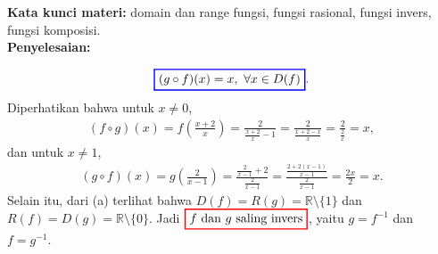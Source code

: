 \documentclass[10pt,openany,a4paper]{article}
\theoremstyle{definition}
\theoremstyle{definition}
\theoremstyle{plain}
\newenvironment{jawab}[2][tes]{%
\par\noindent\textbf{Kata kunci materi:} #1.\\
\textbf{Penyelesaian:} #2%
}{}
\begin{document}
\begin{enumerate}
\begin{jawab}[domain dan range fungsi, fungsi rasional, fungsi invers, fungsi komposisi]
{\begin{enumerate}
\begin{align*}
        \color{blue}
        \setlength{\fboxrule}{1pt} \boxed{\color{oldcolor}(g\circ f)(x)=x,~\forall x\in D(f)}\color{oldcolor}.
            \end{align*}
            Diperhatikan bahwa untuk $x\neq 0$,
            \begin{align*}
                (f\circ g)(x) = f\left(\frac{x+2}{x}\right) = \frac{2}{\frac{x+2}{x}-1} = \frac{2}{\frac{x+2-x}{x}} = \frac{2}{\frac{2}{x}} = x,
            \end{align*}
            dan untuk $x\neq 1$,
            \begin{align*}
                (g\circ f)(x) = g\left(\frac{2}{x-1}\right) = \frac{\frac{2}{x-1}+2}{\frac{2}{x-1}} = \frac{\frac{2+2(x-1)}{x-1}}{\frac{2}{x-1}} = \frac{2x}{2} = x.
            \end{align*}
            Selain itu, dari (a) terlihat bahwa $D(f)=R(g)=\mathbb{R}\setminus\{1\}$ dan $R(f)=D(g)=\mathbb{R}\setminus\{0\}$. Jadi $\colorlet{oldcolor}{.}
        \color{red}
        \setlength{\fboxrule}{1pt} \boxed{\color{oldcolor}f \text{ dan } g \text{ saling invers}}\color{oldcolor}$, yaitu $g=f^{-1}$ dan $f=g^{-1}$.
        \end{enumerate}
    }
    \end{jawab}


\end{enumerate}
\end{document}

